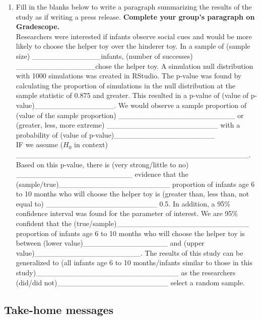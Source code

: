 \documentclass[
]{report}
\providecommand{\tightlist}{%
  \setlength{\itemsep}{0pt}\setlength{\parskip}{0pt}}
\begin{document}
\begin{enumerate}
\def\labelenumi{\arabic{enumi}.}
\setcounter{enumi}{15}
\tightlist
\item
  Fill in the blanks below to write a paragraph summarizing the results of the study as if writing a press release. \textbf{Complete your group's paragraph on Gradescope.}\\
  Researchers were interested if infants observe social cues and would be more likely to choose the helper toy over the hinderer toy. In a sample of (sample size) \_\_\_\_\_\_\_\_\_\_\_\_\_infants, (number of successes) \_\_\_\_\_\_\_\_\_\_\_\_\_\_\_chose the helper toy. A simulation null distribution with 1000 simulations was created in RStudio. The p-value was found by calculating the proportion of simulations in the null distribution at the sample statistic of 0.875 and greater. This resulted in a p-value of (value of p-value)\_\_\_\_\_\_\_\_\_\_\_\_\_\_\_. We would observe a sample proportion of (value of the sample proportion) \_\_\_\_\_\_\_\_\_\_\_\_\_\_\_\_\_\_\_\_\_\_ or (greater, less, more extreme) \_\_\_\_\_\_\_\_\_\_\_\_\_\_\_\_\_\_\_\_\_ with a probability of (value of p-value)\_\_\_\_\_\_\_\_\_\_\_\_\_\_\_\_\_\_\_\\
  IF we assume (\(H_0\) in context) \_\_\_\_\_\_\_\_\_\_\_\_\_\_\_\_\_\_\_\_\_\_\_\_\_\_\_\_\_\_\_\_\_\_\_\_\_\_\_\_\_\_\_\_.
  Based on this p-value, there is (very strong/little to no) \_\_\_\_\_\_\_\_\_\_\_\_\_\_\_\_\_\_\_\_\_\_ evidence that the (sample/true)\_\_\_\_\_\_\_\_\_\_\_\_\_\_\_\_\_\_\_\_\_ proportion of infants age 6 to 10 months who will choose the helper toy is (greater than, less than, not equal to) \_\_\_\_\_\_\_\_\_\_\_\_\_\_\_\_\_\_\_\_\_ 0.5. In addition, a 95\% confidence interval was found for the parameter of interest. We are 95\% confident that the (true/sample)\_\_\_\_\_\_\_\_\_\_\_\_\_\_\_\_\_\_\_\_\_\_\_\_\_ proportion of infants age 6 to 10 months who will choose the helper toy is between (lower value)\_\_\_\_\_\_\_\_\_\_\_\_\_\_\_\_ and (upper value)\_\_\_\_\_\_\_\_\_\_\_\_\_\_\_\_\_\_\_\_. The results of this study can be generalized to (all infants age 6 to 10 months/infants similar to those in this study)\_\_\_\_\_\_\_\_\_\_\_\_\_\_\_\_\_\_\_\_\_\_\_\_\_\_\_ as the researchers (did/did not)\_\_\_\_\_\_\_\_\_\_\_\_\_\_\_\_\_\_\_\_\_ select a random sample.
\end{enumerate}


\hypertarget{take-home-messages-2}{%
\subsection{Take-home messages}\label{take-home-messages-2}}
\end{document}
